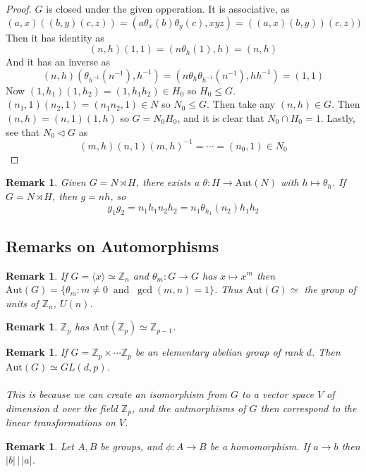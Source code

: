 \documentclass[a4paper,10pt]{article}
\newcommand{\ZZ}{\mathbb{Z}}
\newtheorem{rem}[thm]{Remark}
\begin{document}
\begin{proof}
$G$ is closed under the given opperation. It is associative, as
\[ (a,x) ((b,y) (c,z)) = (a \theta_x (b) \theta_y (c), xyz) = ((a,x)(b,y))(c,z))\]
Then it has identity as
\[ (n,h) (1,1) = (n \theta_h(1), h) = (n,h) \]
And it has an inverse as
\[ (n,h)(\theta_{h^{-1}}(n^{-1}), h^{-1}) = (n \theta_h \theta_{h^{-1}} (n^{-1}), hh^{-1} ) = (1,1) \]
Now $(1,h_1) (1,h_2) = (1, h_1h_2) \in H_0$ so $H_0 \leq G$. $(n_1, 1)(n_2, 1) = (n_1n_2, 1) \in N$ so $N_0 \leq G$. Then take any $(n,h) \in G$. Then $(n,h) = (n,1)(1,h)$ so $G = N_0 H_0$, and it is clear that $N_0 \cap H_0 = 1$. Lastly, see that $N_0 \triangleleft G$ as
\[ (m,h) (n,1) (m,h)^{-1} = \cdots = (n_0, 1) \in N_0 \]

\end{proof}


\begin{rem}
Given $G = N \rtimes H$, there exists a $\theta : H \rightarrow \text{Aut}(N)$ with $h \mapsto \theta_h$. If $G = N \rtimes H$, then $g = nh$, so
\[ g_1 g_2 = n_1 h_1 n_2 h_2 = n_1 \theta_{h_1}(n_2) h_1 h_2 \]
\end{rem}

\subsection{Remarks on Automorphisms}

\begin{rem}
If $G = \langle x \rangle \simeq \ZZ_n$ and $\theta_m : G \rightarrow G$ has $x \mapsto x^m$ then $\text{Aut}(G)= \{ \theta_m : m \neq 0 \ \text{ and } \ \gcd(m,n) = 1 \}$. Thus $\text{Aut}(G) \simeq $ the group of units of $\ZZ_n$, $U(n)$. 
\end{rem}

\begin{rem}
$\ZZ_p$ has $\text{Aut}(\ZZ_p) \simeq \ZZ_{p-1}$. 
\end{rem}

\begin{rem}
If $G = \ZZ_p \times \cdots \ZZ_p$ be an elementary abelian group of rank $d$. Then $\text{Aut}(G) \simeq GL(d,p)$. \\
\\
This is because we can create an isomorphism from $G$ to a vector space $V$ of dimension $d$ over the field $\ZZ_p$, and the autmorphisms of $G$ then correspond to the linear transformations on $V$. 
\end{rem}

\begin{rem}
Let $A,B$ be groups, and $\phi : A \rightarrow B$ be a homomorphism. If $a \rightarrow b$ then $|b| \, \big| \, |a|$.  
\end{rem}
\end{document}
